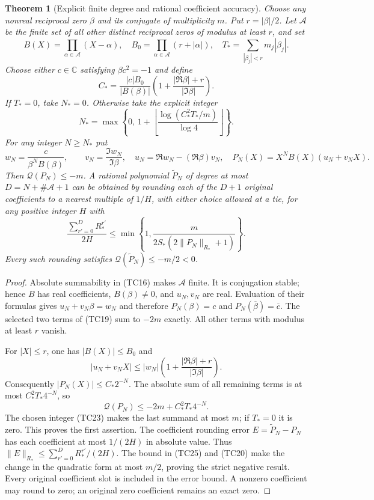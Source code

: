 \documentclass[11pt]{article}
\newtheorem{theorem}{Theorem}
\newcommand{\C}{\mathbb C}
\begin{document}
\begin{theorem}[Explicit finite degree and rational coefficient accuracy]
Choose any nonreal reciprocal zero $\beta$ and its conjugate of
multiplicity $m$. Put $r=|\beta|/2$. Let $\mathcal A$ be the finite
set of all other distinct reciprocal zeros of modulus at least
$r$, and set
\[
B(X)=\prod_{\alpha\in\mathcal A}(X-\alpha),\quad
B_0=\prod_{\alpha\in\mathcal A}(r+|\alpha|),\quad
T_*=\sum_{|\beta_j|<r}m_j|\beta_j|.
\tag{TC21}
\]
Choose either $c\in\C$ satisfying $\beta c^2=-1$ and define
\[
C_*=\frac{|c|B_0}{|B(\beta)|}
\left(1+\frac{|\Re\beta|+r}{|\Im\beta|}\right).
\tag{TC22}
\]
If $T_*=0$, take $N_*=0$. Otherwise take the explicit integer
\[
N_*=\max\left\{0,\,
1+\left\lfloor\frac{\log(C_*^2T_*/m)}{\log4}\right\rfloor\right\}.
\tag{TC23}
\]
For any integer $N\ge N_*$ put
\[
w_N=\frac{c}{\beta^NB(\beta)},\qquad
v_N=\frac{\Im w_N}{\Im\beta},\quad
u_N=\Re w_N-(\Re\beta)v_N,\quad
P_N(X)=X^NB(X)(u_N+v_NX).
\tag{TC24}
\]
Then $\mathcal Q(P_N)\le-m$. A rational polynomial
$\widetilde P_N$ of degree at most
$D=N+\#\mathcal A+1$ can be obtained by rounding each of the
$D+1$ original coefficients to a nearest multiple of $1/H$,
with either choice allowed at a tie, for any
positive integer $H$ with
\[
\frac{\sum_{r'=0}^D R_*^{r'}}{2H}
\le
\min\left\{1,\frac{m}{2S_*(2\|P_N\|_{R_*}+1)}\right\}.
\tag{TC25}
\]
Every such rounding satisfies
$\mathcal Q(\widetilde P_N)\le-m/2<0$.
\end{theorem}
\begin{proof}
Absolute summability in (TC16) makes $\mathcal A$ finite.
It is conjugation stable; hence $B$ has real coefficients,
$B(\beta)\ne0$, and $u_N,v_N$ are real. Evaluation of their
formulas gives $u_N+v_N\beta=w_N$ and therefore
$P_N(\beta)=c$ and $P_N(\overline\beta)=\overline c$.
The selected two terms of (TC19) sum to $-2m$ exactly.
All other terms with modulus at least $r$ vanish.

For $|X|\le r$, one has $|B(X)|\le B_0$ and
\[
|u_N+v_NX|
\le |w_N|\left(1+\frac{|\Re\beta|+r}{|\Im\beta|}\right).
\]
Consequently $|P_N(X)|\le C_*2^{-N}$. The absolute sum of
all remaining terms is at most $C_*^2T_*4^{-N}$, so
\[
\mathcal Q(P_N)\le-2m+C_*^2T_*4^{-N}.
\tag{TC26}
\]
The chosen integer (TC23) makes the last summand at most $m$;
if $T_*=0$ it is zero. This proves the first assertion.
The coefficient rounding error $E=\widetilde P_N-P_N$ has
each coefficient at most $1/(2H)$ in absolute value.
Thus $\|E\|_{R_*}\le\sum_{r'=0}^DR_*^{r'}/(2H)$.
The bound in (TC25) and (TC20) make the change in the quadratic
form at most $m/2$, proving the strict negative result.
Every original coefficient slot is included in the error bound.
A nonzero coefficient may round to zero; an original zero
coefficient remains an exact zero.
\end{proof}
\end{document}
